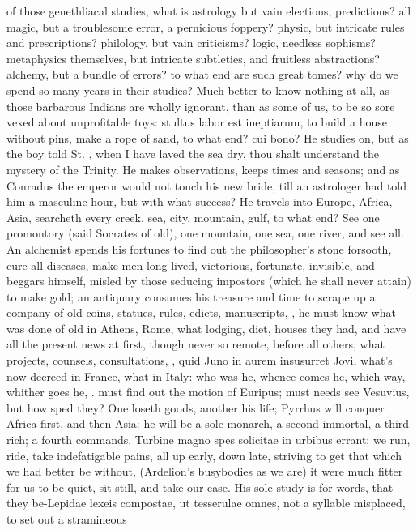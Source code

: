 {{of those genethliacal studies, what is astrology but vain elections,
predictions? all magic, but a troublesome error, a pernicious foppery?
physic, but intricate rules and prescriptions? philology, but vain
criticisms? logic, needless sophisms? metaphysics themselves, but
intricate subtleties, and fruitless abstractions? alchemy, but a bundle
of errors? to what end are such great tomes? why do we spend so many
years in their studies? Much better to know nothing at all, as those
barbarous Indians are wholly ignorant, than as some of us, to be so
sore vexed about unprofitable toys: stultus labor est ineptiarum, to
build a house without pins, make a rope of sand, to what end? cui bono?
He studies on, but as the boy told St. \Austin{}, when I have laved the
sea dry, thou shalt understand the mystery of the Trinity. He makes
observations, keeps times and seasons; and as Conradus the
emperor would not touch his new bride, till an astrologer had told him
a masculine hour, but with what success? He travels into Europe,
Africa, Asia, searcheth every creek, sea, city, mountain, gulf, to what
end? See one promontory (said Socrates of old), one mountain, one sea,
one river, and see all. An alchemist spends his fortunes to find out
the philosopher's stone forsooth, cure all diseases, make men
long-lived, victorious, fortunate, invisible, and beggars himself,
misled by those seducing impostors (which he shall never attain) to
make gold; an antiquary consumes his treasure and time to scrape up a
company of old coins, statues, rules, edicts, manuscripts, \etc{}, he must
know what was done of old in Athens, Rome, what lodging, diet, houses
they had, and have all the present news at first, though never so
remote, before all others, what projects, counsels, consultations, \etc{},
quid Juno in aurem insusurret Jovi, what's now decreed in France, what
in Italy: who was he, whence comes he, which way, whither goes he, \etc{}.
\Aristotle must find out the motion of Euripus; \Pliny{} must needs see
Vesuvius, but how sped they? One loseth goods, another his life;
Pyrrhus will conquer Africa first, and then Asia: he will be a sole
monarch, a second immortal, a third rich; a fourth commands. 
Turbine magno spes solicitae in urbibus errant; we run, ride, take
indefatigable pains, all up early, down late, striving to get that
which we had better be without, (Ardelion's busybodies as we are) it
were much fitter for us to be quiet, sit still, and take our ease. His
sole study is for words, that they be-Lepidae lexeis compostae, ut
tesserulae omnes, not a syllable misplaced, to set out a stramineous
}}
